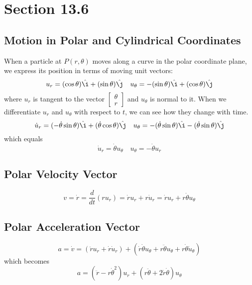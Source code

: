 \documentclass[../main.tex]{subfiles}
\begin{document}
\section{Section 13.6}
\subsection{Motion in Polar and Cylindrical Coordinates}
When a particle at $P(r,\theta)$ moves along a curve in the polar coordinate plane, we express its
position in terms of moving unit vectors:
\begin{equation*}
u_r = (\cos \theta) \ihat + (\sin \theta) \jhat \quad u_\theta = -(\sin \theta)\ihat + (\cos \theta)\jhat
\end{equation*}
where $u_r$ is tangent to the vector $\begin{bmatrix} \theta \\ r \end{bmatrix}$ and $u_\theta$ is 
normal to it. When we differentiate $u_r$ and $u_\theta$ with respect to $t$, we can see how they 
change with time.
\begin{equation*}
\dot u_r = (-\dot{\theta}\sin \theta) \ihat + (\dot{\theta}\cos \theta) \jhat \quad 
u_\theta = -(\dot{\theta}\sin \theta) \ihat - (\dot{\theta}\sin \theta) \jhat
\end{equation*}
which equals 
\begin{equation*}
\dot u_r = \dot{\theta} u_\theta \quad u_\theta = -\dot{\theta} u_r
\end{equation*}

\subsection{Polar Velocity Vector}
\begin{equation*}
v = \dot r = \frac{d}{dt} \left( r u_r \right) = \dot r u_r + r \dot u_r = \dot r u_r + r \dot \theta u_\theta
\end{equation*}

\subsection{Polar Acceleration Vector}
\begin{equation*}
a = \dot v = (\ddot r u_r + \dot r \dot u_r) + 
(\dot r \dot \theta u_\theta + r \ddot \theta u_\theta + r \dot \theta \dot u_\theta)
\end{equation*}
which becomes 
\begin{equation*}
a = (\ddot r - r \dot \theta^2)u_r + (r \ddot \theta + 2 \dot r \dot \theta) u_\theta
\end{equation*}
\end{document}
